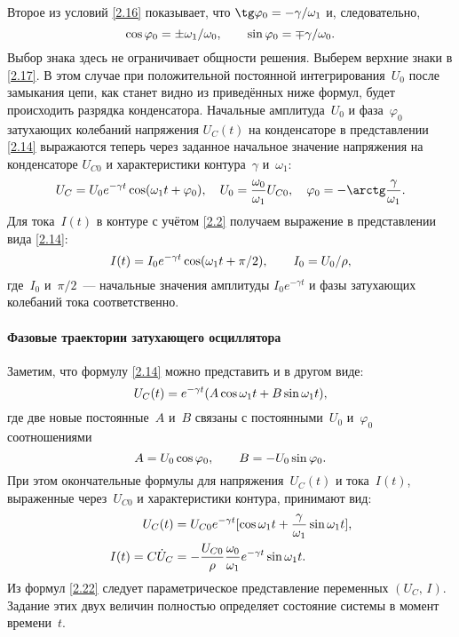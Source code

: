 Второе из условий \eqref{2.16} показывает, что $\tg\varphi_0=-\gamma/\omega_1$
и, следовательно,
\begin{equation}\eqmark{2.17}
\cos\varphi_0=\pm\omega_1/\omega_0, \qquad \sin\varphi_0=\mp\gamma/\omega_0.
\end{equation}
Выбор знака здесь не ограничивает общности решения. Выберем верхние знаки в
\eqref{2.17}. В этом случае при положительной постоянной интегрирования~$U_0$
после замыкания цепи, как станет видно из приведённых ниже формул, будет
происходить разрядка конденсатора. Начальные амплитуда~$U_0$ и фаза~$\varphi_0$
затухающих колебаний напряжения $U_C(t)$ на конденсаторе в представлении
\eqref{2.14} выражаются теперь через заданное начальное значение напряжения на
конденсаторе $U_{C0}$ и характеристики контура~$\gamma$ и~$\omega_1$:
\begin{equation}\eqmark{2.18}
U_C=U_0e^{-\gamma t}\cos(\omega_1t+\varphi_0), \quad
U_0=\frac{\omega_0}{\omega_1}U_{C0}, \quad 
\varphi_0=-\arctg \frac{\gamma}{\omega_1}.
\end{equation}
Для тока~$I(t)$ в контуре с учётом \eqref{2.2} получаем выражение в
представлении вида \eqref{2.14}:
\begin{equation}\eqmark{2.19}
I(t)=I_0e^{-\gamma t}\cos(\omega_1t+\pi/2), \qquad I_0=U_0/\rho,
\end{equation}
где~$I_0$ и~$\pi/2$~--- начальные значения амплитуды $I_0e^{-\gamma t}$ и фазы
затухающих колебаний тока соответственно.

\paragraph{Фазовые траектории затухающего осциллятора}

Заметим, что формулу \eqref{2.14} можно представить и в другом виде:
\begin{equation}\eqmark{2.20}
U_C(t)=e^{-\gamma t}(A\cos\omega_1 t+B\sin\omega_1 t),
\end{equation}
где две новые постоянные~$A$ и~$B$ связаны с постоянными~$U_0$ и~$\varphi_0$
соотношениями
\begin{equation}\eqmark{2.21}
A=U_0\cos\varphi_0, \qquad B=-U_0\sin\varphi_0.
\end{equation}
При этом окончательные формулы для напряжения~$U_C(t)$ и тока~$I(t)$, выраженные
через~$U_{C0}$ и характеристики контура, принимают вид:
\begin{equation}
	\eqmark{2.22}
		\begin{aligned}
			U_C(t)&=U_{C0}e^{-\gamma
t}[\cos\omega_1t+ \frac{\gamma}{\omega_1}\sin\omega_1t], \\
			I(t)=C\dot{U}_C
&=-\frac{U_{C0}}{\rho} \frac{\omega_0}{\omega_1}e^{-\gamma t}\sin\omega_1t.
		\end{aligned}
\end{equation}
Из формул \eqref{2.22} следует параметрическое представление
 переменных 
$(U_C,\,I)$. Задание этих двух величин полностью определяет состояние
системы в момент времени~$t$.


